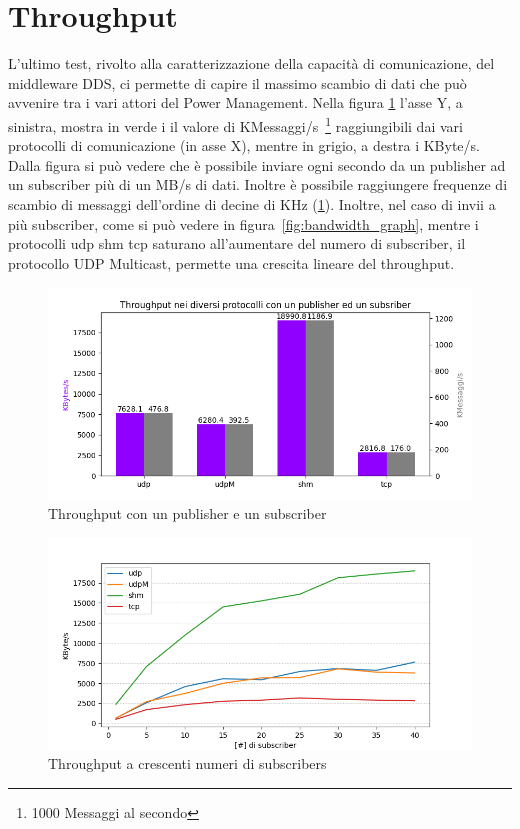 \section{Throughput} %
L'ultimo test, rivolto alla caratterizzazione della capacità di comunicazione, del middleware DDS, ci permette di capire il massimo scambio di dati che può avvenire tra i vari attori del Power Management. Nella figura \ref{fig:throughput_combined} l'asse Y, a sinistra, mostra in verde i il valore di KMessaggi/s~\footnote{1000 Messaggi al secondo} raggiungibili dai vari protocolli di comunicazione (in asse X), mentre in grigio, a destra i KByte/s. Dalla figura si può vedere che è possibile inviare ogni secondo da un publisher ad un subscriber più di un MB/s di dati. Inoltre è possibile raggiungere frequenze di scambio di messaggi dell'ordine di decine di KHz (\ref{fig:throughput_combined}). Inoltre, nel caso di invii a più subscriber, come si può vedere in figura~\ref{fig:bandwidth_graph}, mentre i protocolli udp shm tcp saturano all'aumentare del numero di subscriber, il protocollo UDP Multicast, permette una crescita lineare del throughput.

\begin{figure}[H]
    \includegraphics[width=\textwidth]{./results/test3_throughput_combined.png} 
        \caption{Throughput con un publisher e un subscriber}\label{fig:throughput_combined}
\end{figure}

\begin{figure}[H]
    \includegraphics[width=\textwidth]{./results/test3_graph_throughput.png} 
    \caption{Throughput a crescenti numeri di subscribers}\label{fig:throughput_increasing}
\end{figure}

